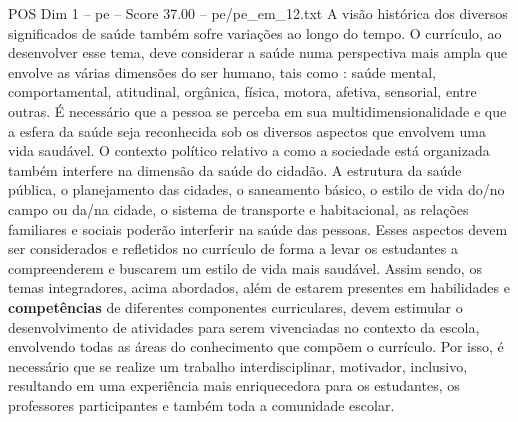 \begin{textsample}{POS Dim 1 – pe – Score 37.00 – pe/pe\_em\_12.txt}
A visão histórica dos diversos significados de saúde também sofre variações ao longo do tempo.
O currículo, ao desenvolver esse tema, deve considerar a saúde numa perspectiva mais ampla que envolve as várias dimensões do ser humano, tais como : saúde mental, comportamental, atitudinal, orgânica, física, motora, afetiva, sensorial, entre outras.
É necessário que a pessoa se perceba em sua multidimensionalidade e que a esfera da saúde seja reconhecida sob os diversos aspectos que envolvem uma vida saudável.
O contexto político relativo a como a sociedade está organizada também interfere na dimensão da saúde do cidadão.
A estrutura da saúde pública, o planejamento das cidades, o saneamento básico, o estilo de vida do/no campo ou da/na cidade, o sistema de transporte e habitacional, as relações familiares e sociais poderão interferir na saúde das pessoas.
Esses aspectos devem ser considerados e refletidos no currículo de forma a levar os estudantes a compreenderem e buscarem um estilo de vida mais saudável.
Assim sendo, os temas integradores, acima abordados, além de estarem presentes em habilidades e \textbf{competências} de diferentes componentes curriculares, devem estimular o desenvolvimento de atividades para serem vivenciadas no contexto da escola, envolvendo todas as áreas do conhecimento que compõem o currículo.
Por isso, é necessário que se realize um trabalho interdisciplinar, motivador, inclusivo, resultando em uma experiência mais enriquecedora para os estudantes, os professores participantes e também toda a comunidade escolar.

\end{textsample}
